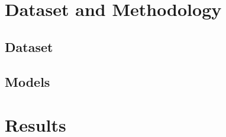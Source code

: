 \documentclass[12pt,a4paper]{report}
\begin{document}
\chapter{Dataset and Methodology}

\section{Dataset}

\section{Models}

\chapter{Results}


\newpage
\nocite{*}


\end{document}
